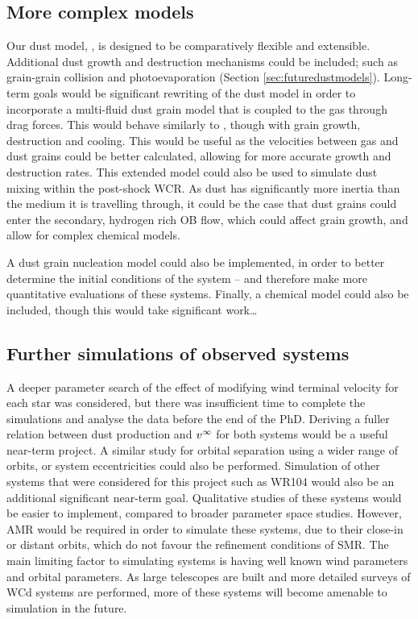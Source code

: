 \subsection{More complex models}

Our dust model, \bidmas{}, is designed to be comparatively flexible and extensible.
Additional dust growth and destruction mechanisms could be included; such as grain-grain collision and photoevaporation (Section \ref{sec:futuredustmodels}).
Long-term goals would be significant rewriting of the dust model in order to incorporate a multi-fluid dust grain model that is coupled to the gas through drag forces.
This would behave similarly to \textcite{hendrix_pinwheels_2016}, though with grain growth, destruction and cooling.
This would be useful as the velocities between gas and dust grains could be better calculated, allowing for more accurate growth and destruction rates.
This extended model could also be used to simulate dust mixing within the post-shock WCR.
As dust has significantly more inertia than the medium it is travelling through, it could be the case that dust grains could enter the secondary, hydrogen rich OB flow, which could affect grain growth, and allow for complex chemical models. 

A dust grain nucleation model could also be implemented, in order to better determine the initial conditions of the system -- and therefore make more quantitative evaluations of these systems.
Finally, a chemical model could also be included, though this would take significant work\ldots

\subsection{Further simulations of observed systems}

A deeper parameter search of the effect of modifying wind terminal velocity for each star was considered, but there was insufficient time to complete the simulations and analyse the data before the end of the PhD.
Deriving a fuller relation between dust production and $v^\infty$ for both systems would be a useful near-term project.
A similar study for orbital separation using a wider range of orbits, or system eccentricities could also be performed.
Simulation of other systems that were considered for this project such as WR104 would also be an additional significant near-term goal.
Qualitative studies of these systems would be easier to implement, compared to broader parameter space studies.
However, AMR would be required in order to simulate these systems, due to their close-in or distant orbits, which do not favour the refinement conditions of SMR.
The main limiting factor to simulating systems is having well known wind parameters and orbital parameters.
As large telescopes are built and more detailed surveys of WCd systems are performed, more of these systems will become amenable to simulation in the future.


